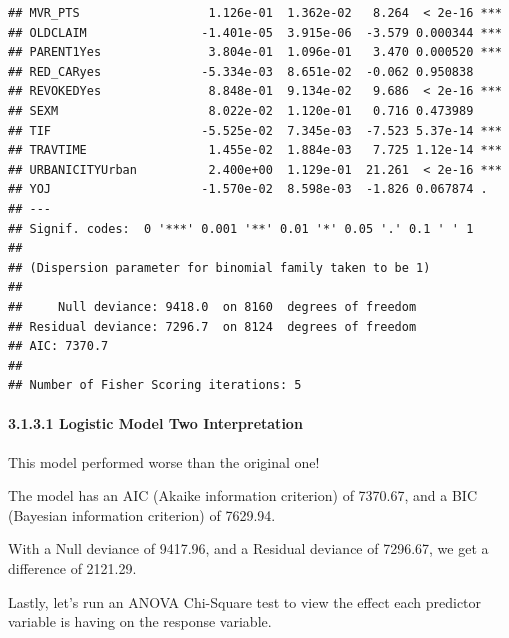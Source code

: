 \documentclass[]{article}
\let\oldparagraph\paragraph
\renewcommand{\paragraph}[1]{\oldparagraph{#1}\mbox{}}
\begin{document}
\begin{verbatim}
## MVR_PTS                  1.126e-01  1.362e-02   8.264  < 2e-16 ***
## OLDCLAIM                -1.401e-05  3.915e-06  -3.579 0.000344 ***
## PARENT1Yes               3.804e-01  1.096e-01   3.470 0.000520 ***
## RED_CARyes              -5.334e-03  8.651e-02  -0.062 0.950838    
## REVOKEDYes               8.848e-01  9.134e-02   9.686  < 2e-16 ***
## SEXM                     8.022e-02  1.120e-01   0.716 0.473989    
## TIF                     -5.525e-02  7.345e-03  -7.523 5.37e-14 ***
## TRAVTIME                 1.455e-02  1.884e-03   7.725 1.12e-14 ***
## URBANICITYUrban          2.400e+00  1.129e-01  21.261  < 2e-16 ***
## YOJ                     -1.570e-02  8.598e-03  -1.826 0.067874 .  
## ---
## Signif. codes:  0 '***' 0.001 '**' 0.01 '*' 0.05 '.' 0.1 ' ' 1
## 
## (Dispersion parameter for binomial family taken to be 1)
## 
##     Null deviance: 9418.0  on 8160  degrees of freedom
## Residual deviance: 7296.7  on 8124  degrees of freedom
## AIC: 7370.7
## 
## Number of Fisher Scoring iterations: 5
\end{verbatim}

\paragraph{3.1.3.1 Logistic Model Two
Interpretation}\label{logistic-model-two-interpretation}

This model performed worse than the original one!

The model has an AIC (Akaike information criterion) of 7370.67, and a
BIC (Bayesian information criterion) of 7629.94.

With a Null deviance of 9417.96, and a Residual deviance of 7296.67, we
get a difference of 2121.29.

Lastly, let's run an ANOVA Chi-Square test to view the effect each
predictor variable is having on the response variable.
\end{document}
